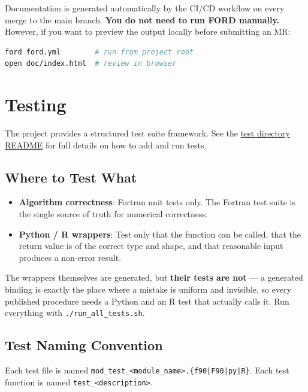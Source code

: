 \documentclass{article}
\begin{document}
Documentation is generated automatically by the CI/CD workflow on every merge to the main branch. \textbf{You do not need to run FORD manually.} However, if you want to preview the output locally before submitting an MR:

\begin{lstlisting}[language=bash]
ford ford.yml        # run from project root
open doc/index.html  # review in browser
\end{lstlisting}

\section{Testing}

The project provides a structured test suite framework. See the \href{https://github.com/asishallab-group/Tensor-Omics/blob/main/test/readme.md}{test directory README} for full details on how to add and run tests.

\subsection{Where to Test What}

\begin{itemize}
  \item \textbf{Algorithm correctness}: Fortran unit tests only.
    The Fortran test suite is the single source of truth for numerical correctness.
  \item \textbf{Python / R wrappers}: Test only that the function can be called, that the return value is of the correct type and shape, and that reasonable input produces a non-error result.
\end{itemize}

The wrappers themselves are generated, but \textbf{their tests are not} — a generated binding is
exactly the place where a mistake is uniform and invisible, so every published procedure needs a
Python and an R test that actually calls it. Run everything with \texttt{./run\_all\_tests.sh}.

\subsection{Test Naming Convention}

Each test file is named \texttt{mod\_test\_<module\_name>.\{f90|F90|py|R\}}.
Each test function is named \texttt{test\_<description>}.
\end{document}
